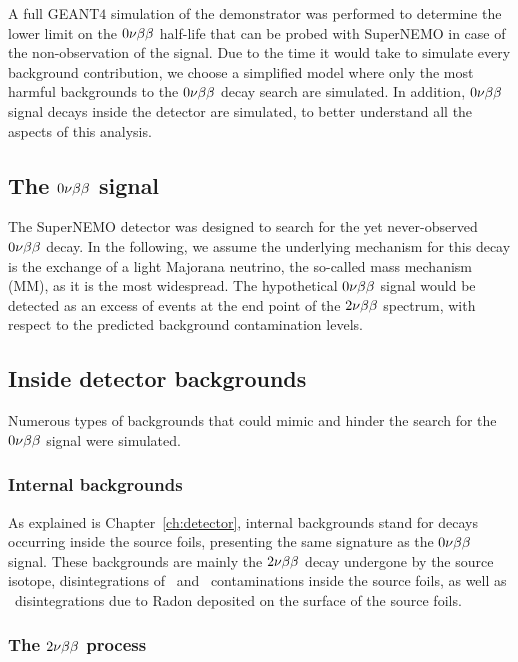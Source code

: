 A full GEANT$4$ simulation of the demonstrator was performed to determine the lower limit on the $0\nu\beta\beta$ half-life that can be probed with SuperNEMO in case of the non-observation of the signal.
Due to the time it would take to simulate every background contribution, we choose a simplified model where only the most harmful backgrounds to the $0\nu\beta\beta$ decay search are simulated.
In addition, $0\nu\beta\beta$ signal decays inside the detector are simulated, to better understand all the aspects of this analysis.

\subsection{The $0\nu\beta\beta$ signal}

The SuperNEMO detector was designed to search for the yet never-observed $0\nu\beta\beta$ decay.
In the following, we assume the underlying mechanism for this decay is the exchange of a light Majorana neutrino, the so-called mass mechanism (MM), as it is the most widespread.
The hypothetical $0\nu\beta\beta$ signal would be detected as an excess of events at the end point of the $2\nu\beta\beta$ spectrum, with respect to the predicted background contamination levels.

\subsection{Inside detector backgrounds}

Numerous types of backgrounds that could mimic and hinder the search for the $0\nu\beta\beta$ signal were simulated.

\subsubsection{Internal backgrounds}

As explained is Chapter~\ref{ch:detector}, internal backgrounds stand for decays occurring inside the source foils, presenting the same signature as the $0\nu\beta\beta$ signal.
These backgrounds are mainly the $2\nu\beta\beta$ decay undergone by the source isotope, disintegrations of \Tl\ and \Bi\ contaminations inside the source foils, as well as \Bi\ disintegrations due to Radon deposited on the surface of the source foils.

\subsubsection*{The $2\nu\beta\beta$ process}

